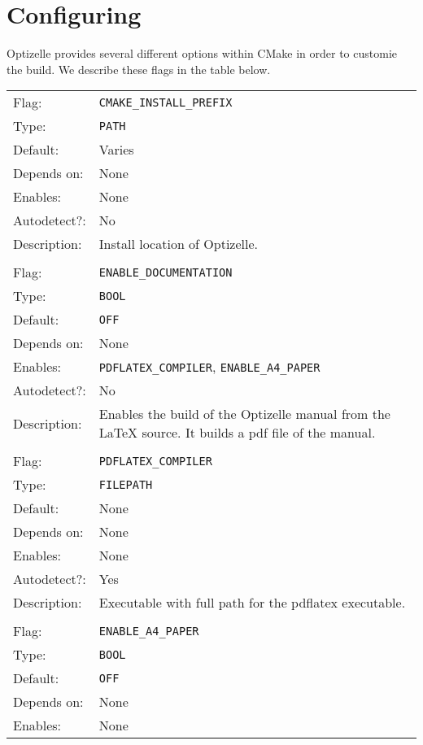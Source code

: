 \documentclass{report}
\begin{document}
\section{Configuring}

        Optizelle provides several different options within CMake in order to customie the build.  We describe these flags in the table below.          
\begin{center}
\begin{longtable}{p{}p{}}
Flag:         &\texttt{CMAKE\_INSTALL\_PREFIX}\\
Type:         &\texttt{PATH}\\
Default:      &Varies\\
Depends on:   &None\\
Enables:      &None\\
Autodetect?:  &No\\
Description:  &Install location of Optizelle.\\
\\
Flag:         &\texttt{ENABLE\_DOCUMENTATION}\\
Type:         &\texttt{BOOL}\\
Default:      &\texttt{OFF}\\
Depends on:   &None\\
Enables:      &\texttt{PDFLATEX\_COMPILER}, \texttt{ENABLE\_A4\_PAPER}\\
Autodetect?:  &No\\
Description:  &Enables the build of the Optizelle manual from the LaTeX source.
               It builds a pdf file of the manual.\\
\\
Flag:         &\texttt{PDFLATEX\_COMPILER}\\
Type:         &\texttt{FILEPATH}\\
Default:      &None\\
Depends on:   &None\\
Enables:      &None\\
Autodetect?:  &Yes\\
Description:  &Executable with full path for the pdflatex executable.\\
\\
Flag:         &\texttt{ENABLE\_A4\_PAPER}\\
Type:         &\texttt{BOOL}\\
Default:      &\texttt{OFF}\\
Depends on:   &None\\
Enables:      &None\\

\end{longtable}
\end{center}
\end{document}
